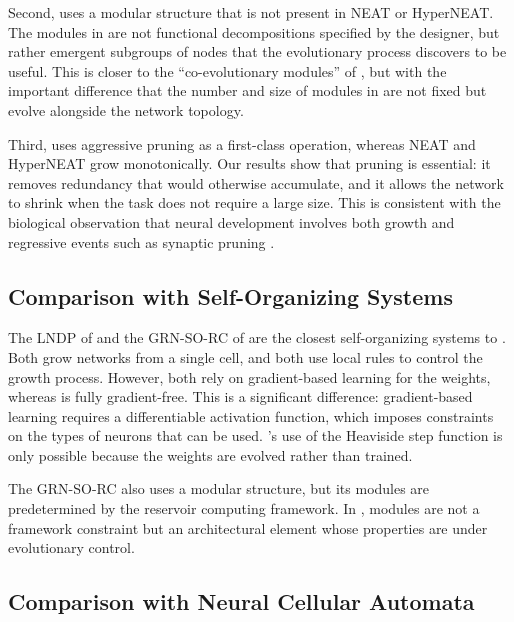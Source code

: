 Second, \modnet{} uses a modular structure that is not present in
NEAT or HyperNEAT. The modules in \modnet{} are not functional
decompositions specified by the designer, but rather emergent
subgroups of nodes that the evolutionary process discovers to be
useful. This is closer to the ``co-evolutionary modules'' of
\citet{khare2005coevolutionary}, but with the important difference
that the number and size of modules in \modnet{} are not fixed but
evolve alongside the network topology.

Third, \modnet{} uses aggressive pruning as a first-class operation,
whereas NEAT and HyperNEAT grow monotonically. Our results show that
pruning is essential: it removes redundancy that would otherwise
accumulate, and it allows the network to shrink when the task does
not require a large size. This is consistent with the biological
observation that neural development involves both growth and
regressive events such as synaptic pruning
\citep{chklovskii2004wiring}.

\subsection{Comparison with Self-Organizing Systems}
\label{sec:relation-self-org}

The LNDP of \citet{plantec2024evolving} and the GRN-SO-RC of
\citet{hajizada2024developmental} are the closest self-organizing
systems to \modnet{}. Both grow networks from a single cell, and both
use local rules to control the growth process. However, both rely on
gradient-based learning for the weights, whereas \modnet{} is fully
gradient-free. This is a significant difference: gradient-based
learning requires a differentiable activation function, which imposes
constraints on the types of neurons that can be used. \modnet{}'s
use of the Heaviside step function is only possible because the
weights are evolved rather than trained.

The GRN-SO-RC also uses a modular structure, but its modules are
predetermined by the reservoir computing framework. In \modnet{},
modules are not a framework constraint but an architectural element
whose properties are under evolutionary control.

\subsection{Comparison with Neural Cellular Automata}
\label{sec:relation-nca}

